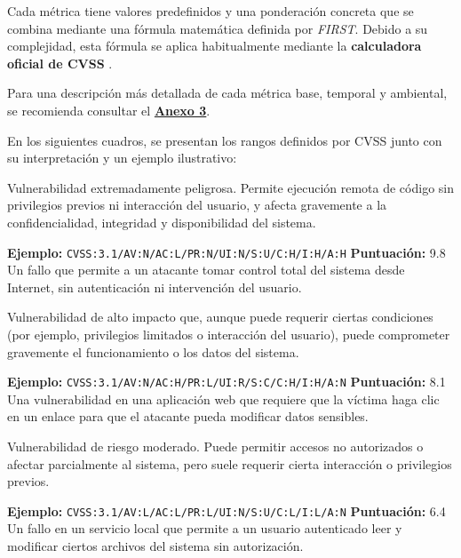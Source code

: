 \documentclass[a4paper, 11pt]{article}
\begin{document}
Cada métrica tiene valores predefinidos y una ponderación concreta que se combina mediante una fórmula matemática definida por \textit{FIRST}. Debido a su complejidad, esta fórmula se aplica habitualmente mediante la \textbf{calculadora oficial de CVSS} \cite{cvsscalc}.

Para una descripción más detallada de cada métrica base, temporal y ambiental, se recomienda consultar el \hyperref[anexo:3]{\textbf{Anexo 3}}.

\vspace{0.5cm}

En los siguientes cuadros, se presentan los rangos definidos por CVSS junto con su interpretación y un ejemplo ilustrativo:


\begin{tcolorbox}[colback=cvsscritical!10, colframe=cvsscritical!80!black, coltitle=white,
title=Crítica (CVSS 9.0 -- 10.0)]
Vulnerabilidad extremadamente peligrosa. Permite ejecución remota de código sin privilegios previos ni interacción del usuario, y afecta gravemente a la confidencialidad, integridad y disponibilidad del sistema.

\textbf{Ejemplo:}
\texttt{CVSS:3.1/AV:N/AC:L/PR:N/UI:N/S:U/C:H/I:H/A:H}
\textbf{Puntuación:} 9.8
Un fallo que permite a un atacante tomar control total del sistema desde Internet, sin autenticación ni intervención del usuario.
\end{tcolorbox}

\vspace{0.2cm}

\begin{tcolorbox}[colback=cvsshigh!10, colframe=cvsshigh!80!black, coltitle=white,
title=Alta (CVSS 7.0 -- 8.9)]
Vulnerabilidad de alto impacto que, aunque puede requerir ciertas condiciones (por ejemplo, privilegios limitados o interacción del usuario), puede comprometer gravemente el funcionamiento o los datos del sistema.

\textbf{Ejemplo:}
\texttt{CVSS:3.1/AV:N/AC:H/PR:L/UI:R/S:C/C:H/I:H/A:N}
\textbf{Puntuación:} 8.1
Una vulnerabilidad en una aplicación web que requiere que la víctima haga clic en un enlace para que el atacante pueda modificar datos sensibles.
\end{tcolorbox}

\vspace{0.2cm}

\begin{tcolorbox}[colback=cvssmedium!10, colframe=cvssmedium!80!black, coltitle=white,
title=Media (CVSS 4.0 -- 6.9)]
Vulnerabilidad de riesgo moderado. Puede permitir accesos no autorizados o afectar parcialmente al sistema, pero suele requerir cierta interacción o privilegios previos.

\textbf{Ejemplo:}
\texttt{CVSS:3.1/AV:L/AC:L/PR:L/UI:N/S:U/C:L/I:L/A:N}
\textbf{Puntuación:} 6.4
Un fallo en un servicio local que permite a un usuario autenticado leer y modificar ciertos archivos del sistema sin autorización.
\end{tcolorbox}
\end{document}
